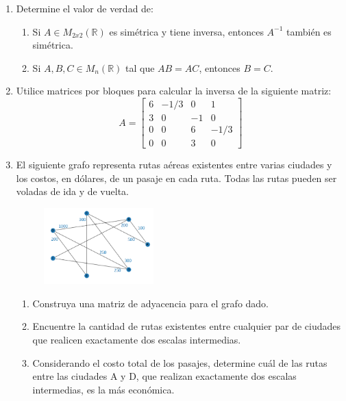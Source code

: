 \documentclass[12pt]{article}
\newcommand{\D}{\displaystyle}
\begin{document}
\begin{enumerate}
    \item Determine el valor de verdad de:
          \begin{enumerate}
              \item Si $A \in M_{2x2}(\mathbb{R})$ es sim\'etrica y tiene inversa, entonces $A^{-1}$ tambi\'en es sim\'etrica.
              \item Si $A, B, C \in M_n(\mathbb{R})$ tal que $AB=AC$, entonces $B=C$.
          \end{enumerate}
          
    \item Utilice matrices por bloques para calcular la inversa de la siguiente matriz:
          $$\D A=\begin{bmatrix}
                  6 & -1/3 & 0  & 1    \\
                  3 & 0    & -1 & 0    \\
                  0 & 0    & 6  & -1/3 \\
                  0 & 0    & 3  & 0
              \end{bmatrix}$$
          \pagebreak
    \item El siguiente grafo representa rutas a\'ereas existentes entre varias ciudades y los costos, en
          d\'olares, de un pasaje en cada ruta. Todas las rutas pueden ser voladas de ida y de vuelta.
          \begin{figure}[ht]
              \centering
              \includegraphics[width = 0.4\textwidth, ]{4.png}\\
          \end{figure}
          \begin{enumerate}
              \item Construya una matriz de adyacencia para el grafo dado.
              \item Encuentre la cantidad de rutas existentes entre cualquier par de ciudades que realicen
                    exactamente dos escalas intermedias.
              \item Considerando el costo total de los pasajes, determine cu\'al de las rutas entre las ciudades
                    A y D, que realizan exactamente dos escalas intermedias, es la m\'as econ\'omica.
          \end{enumerate}
\end{enumerate}
\end{document}
